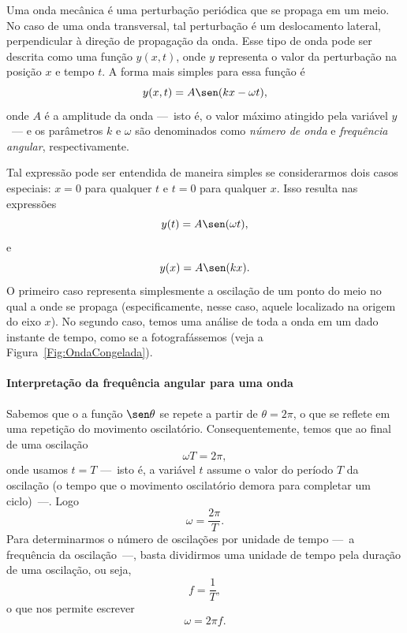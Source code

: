 Uma onda mecânica é uma perturbação periódica que se propaga em um meio. No caso de uma onda transversal, tal perturbação é um deslocamento lateral, perpendicular à direção de propagação da onda. Esse tipo de onda pode ser descrita como uma função $y(x,t)$, onde $y$ representa o valor da perturbação na posição $x$ e tempo $t$. A forma mais simples para essa função é
\begin{equation}\label{Eq:OndaUnidimensional}
	y(x,t) = A \sen(kx - \omega t),
\end{equation}
%
onde $A$ é a amplitude da onda ---~isto é, o valor máximo atingido pela variável $y$~--- e os parâmetros $k$ e $\omega$ são denominados como \emph{número de onda} e \emph{frequência angular}, respectivamente.

Tal expressão pode ser entendida de maneira simples se considerarmos dois casos especiais: $x = 0$ para qualquer $t$ e $t = 0$ para qualquer $x$. Isso resulta nas expressões
\begin{equation}
	y(t) = A \sen (\omega t),
\end{equation}
%
e
\begin{equation}
	y(x) = A \sen(kx).
\end{equation}
%
O primeiro caso representa simplesmente a oscilação de um ponto do meio no qual a onde se propaga (especificamente, nesse caso, aquele localizado na origem do eixo $x$). No segundo caso, temos uma análise de toda a onda em um dado instante de tempo, como se a fotografássemos (veja a Figura~\ref{Fig:OndaCongelada}).

\paragraph{Interpretação da frequência angular para uma onda}

Sabemos que o a função $\sen \theta$ se repete a partir de $\theta = 2\pi$, o que se reflete em uma repetição do movimento oscilatório. Consequentemente, temos que ao final de uma oscilação
\begin{equation}
	\omega T = 2 \pi,
\end{equation}
%
onde usamos $t = T$ ---~isto é, a variável $t$ assume o valor do período $T$ da oscilação (o tempo que o movimento oscilatório demora para completar um ciclo)~---. Logo
\begin{equation}
	\omega = \frac{2 \pi}{T}.
\end{equation}
%
Para determinarmos o número de oscilações por unidade de tempo ---~a frequência da oscilação~---, basta dividirmos uma unidade de tempo pela duração de uma oscilação, ou seja,
\begin{equation}
	f = \frac{1}{T},
\end{equation}
%
o que nos permite escrever
\begin{equation}
	\omega = 2 \pi f.
\end{equation}

